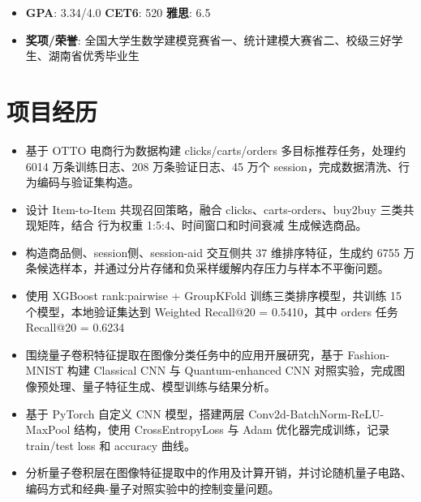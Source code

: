 \documentclass{resume}
\begin{document}
\vspace{-0.6em}

\begin{itemize}
    \item \textbf{GPA}: 3.34/4.0 \hfill \textbf{CET6}: 520 \hfill \textbf{雅思}: 6.5
    \item \textbf{奖项/荣誉}: 全国大学生数学建模竞赛省一、统计建模大赛省二、校级三好学生、湖南省优秀毕业生
\end{itemize}

\section{项目经历}
\begin{itemize}

  \item 基于 OTTO 电商行为数据构建 clicks/carts/orders 多目标推荐任务，处理约 6014 万条训练日志、208 万条验证日志、45 万个 session，完成数据清洗、行为编码与验证集构造。
  \item 设计 Item-to-Item 共现召回策略，融合 clicks、carts-orders、buy2buy 三类共现矩阵，结合 行为权重 1:5:4、时间窗口和时间衰减 生成候选商品。
  \item 构造商品侧、session侧、session-aid 交互侧共 37 维排序特征，生成约 6755 万条候选样本，并通过分片存储和负采样缓解内存压力与样本不平衡问题。
  \item 使用 XGBoost rank:pairwise + GroupKFold 训练三类排序模型，共训练 15 个模型，本地验证集达到 Weighted Recall@20 = 0.5410，其中 orders 任务 Recall@20 = 0.6234
\end{itemize}

\begin{itemize}
  \item 围绕量子卷积特征提取在图像分类任务中的应用开展研究，基于 Fashion-MNIST 构建 Classical CNN 与 Quantum-enhanced CNN 对照实验，完成图像预处理、量子特征生成、模型训练与结果分析。
  \item 基于 PyTorch 自定义 CNN 模型，搭建两层 Conv2d-BatchNorm-ReLU-MaxPool 结构，使用 CrossEntropyLoss 与 Adam 优化器完成训练，记录 train/test loss 和 accuracy 曲线。
  \item 分析量子卷积层在图像特征提取中的作用及计算开销，并讨论随机量子电路、编码方式和经典-量子对照实验中的控制变量问题。
\end{itemize}
\end{document}
